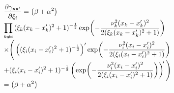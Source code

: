 \documentclass[conference]{IEEEtran}
\begin{document}
	\begin{equation*}
		\hspace{-1.7mm}
		\begin{array}{l}
			\displaystyle\dfrac{\partial\gamma_{\mathbf{x}\mathbf{x}^\prime}}{\partial\xi_i}
			\displaystyle=\left(\beta+\alpha^2\right)\\
			\displaystyle\prod_{k\neq i}{(\xi_k(x_{k}-x^\prime_{k})^2+1)^{-\frac{1}{2}}}\exp\hspace{-0.5mm}\left(-\frac{\nu_k^2(x_{k}-x^\prime_{k})^2}{2(\xi_k(x_{k}-x^\prime_{k})^2+1)}\right)\\
			\displaystyle\times\Bigg(\left({(\xi_i(x_{i}-x^\prime_{i})^2+1)^{-\frac{1}{2}}}\right)^\prime\exp\hspace{-0.5mm}\left(-\frac{\nu_i^2(x_{i}-x^\prime_{i})^2}{2(\xi_i(x_{i}-x^\prime_{i})^2+1)}\right)\\
			\displaystyle+{(\xi_i(x_{i}-x^\prime_{i})^2+1)^{-\frac{1}{2}}}\left(\exp\hspace{-0.5mm}\left(-\frac{\nu_i^2(x_{i}-x^\prime_{i})^2}{2(\xi_i(x_{i}-x^\prime_{i})^2+1)}\right)\right)^{\hspace{-0.5mm}\prime}\Bigg)\\
			\displaystyle=\left(\beta+\alpha^2\right)\\

\end{array}
\end{equation*}
\end{document}
